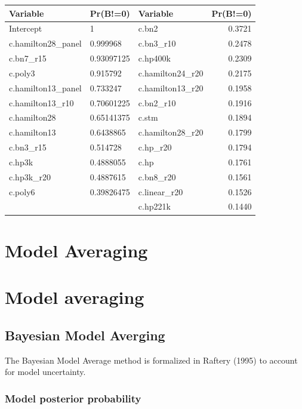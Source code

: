 \documentclass[
  12pt,
]{article}
\begin{document}
\tiny
\begin{table}[H]
\centering
\begin{tabular}[t]{lllr}
\toprule
Variable & Pr(B!=0) & Variable & Pr(B!=0)\\
\midrule
Intercept & 1 & c.bn2 & 0.3721\\
c.hamilton28\_panel & 0.999968 & c.bn3\_r10 & 0.2478\\
c.bn7\_r15 & 0.93097125 & c.hp400k & 0.2309\\
c.poly3 & 0.915792 & c.hamilton24\_r20 & 0.2175\\
c.hamilton13\_panel & 0.733247 & c.hamilton13\_r20 & 0.1958\\
\addlinespace
c.hamilton13\_r10 & 0.70601225 & c.bn2\_r10 & 0.1916\\
c.hamilton28 & 0.65141375 & c.stm & 0.1894\\
c.hamilton13 & 0.6438865 & c.hamilton28\_r20 & 0.1799\\
c.bn3\_r15 & 0.514728 & c.hp\_r20 & 0.1794\\
c.hp3k & 0.4888055 & c.hp & 0.1761\\
\addlinespace
c.hp3k\_r20 & 0.4887615 & c.bn8\_r20 & 0.1561\\
c.poly6 & 0.39826475 & c.linear\_r20 & 0.1526\\
 &  & c.hp221k & 0.1440\\
\bottomrule
\end{tabular}
\end{table}
\normalsize

\hypertarget{model-averaging}{%
\section{Model Averaging}\label{model-averaging}}

\hypertarget{model-averaging-1}{%
\section{Model averaging}\label{model-averaging-1}}

\hypertarget{bayesian-model-averging}{%
\subsection{Bayesian Model Averging}\label{bayesian-model-averging}}

The Bayesian Model Average method is formalized in Raftery (1995) to account for model uncertainty.

\hypertarget{model-posterior-probability}{%
\subsubsection{Model posterior probability}\label{model-posterior-probability}}
\end{document}
